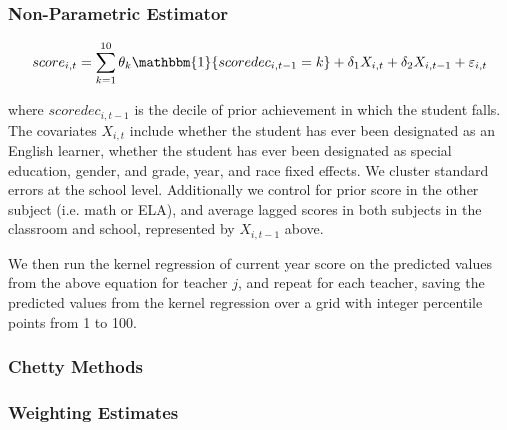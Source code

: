 \documentclass{article}
\theoremstyle{definition}
\theoremstyle{definition}
\theoremstyle{definition}
\theoremstyle{definition}
\begin{document}
        \subsubsection{Non-Parametric Estimator}
        
        \begin{align*}
            score_{i,t} = \sum_{k=1}^{10} \theta_k \mathbbm{1}\{scoredec_{i, t-1} = k\} + \delta_1 X_{i, t} + \delta_2 X_{i, t-1} + \varepsilon_{i, t}
        \end{align*}
            
        \noindent where $scoredec_{i, t-1}$ is the decile of prior achievement in which the student falls. The covariates $X_{i, t}$ include whether the student has ever been designated as an English learner, whether the student has ever been designated as special education, gender, and grade, year, and race fixed effects. We cluster standard errors at the school level. Additionally we control for prior score in the other subject (i.e. math or ELA), and average lagged scores in both subjects in the classroom and school, represented by $X_{i, t-1}$ above.
        
        \noindent We then run the kernel regression of current year score on the predicted values from the above equation for teacher $j$, and repeat for each teacher, saving the predicted values from the kernel regression over a grid with integer percentile points from 1 to 100.

        \subsubsection{Chetty Methods}
        
        \subsubsection{Weighting Estimates}

\end{document}
